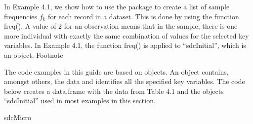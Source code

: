 \documentclass[letterpaper,10pt,english]{sphinxmanual}
\begin{document}
In Example 4.1, we show how to use the  package to create a
list of sample frequencies \(f_{k}\) for each record in a dataset.
This is done by using the  function freq(). A value of 2 for
an observation means that in the sample, there is one more individual
with exactly the same combination of values for the selected key
variables. In Example 4.1, the function freq() is applied to
“sdcInitial”, which is an  object. Footnote %
\begin{footnote}[5]\sphinxAtStartFootnote
The code examples in this guide are based on  objects. An
 object contains, amongst others, the data and identifies
all the specified key variables. The code below creates a data.frame
with the data from Table 4.1 and the  objects “sdcInitial”
used in most examples in this section.

\sphinxSetupCodeBlockInFootnote
{}%
\begin{sphinxVerbatim}[commandchars=\\\{\}]
sdcMicro



\end{sphinxVerbatim}
\end{footnote}
\end{document}

